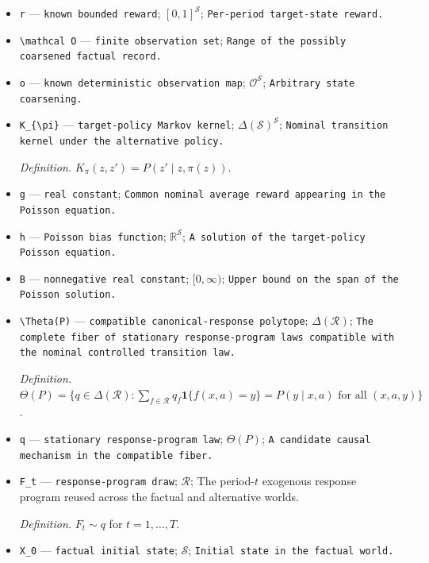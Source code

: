 \documentclass{article}
\begin{document}
\begin{itemize}
  \item \texttt{r} --- \texttt{known bounded reward}; \([0,1]^{\mathcal S}\); \texttt{Per-\allowbreak{}period target-\allowbreak{}state reward.}
  \item \texttt{\textbackslash{}\allowbreak{}mathcal O} --- \texttt{finite observation set}; \texttt{Range of the possibly coarsened factual record.}
  \item \texttt{o} --- \texttt{known deterministic observation map}; \(\mathcal O^{\mathcal S}\); \texttt{Arbitrary state coarsening.}
  \item \texttt{K\_\allowbreak{}\{\textbackslash{}\allowbreak{}pi\}\allowbreak{}} --- \texttt{target-\allowbreak{}policy Markov kernel}; \(\Delta(\mathcal S)^{\mathcal S}\); \texttt{Nominal transition kernel under the alternative policy.}
  \par\smallskip\noindent\emph{Definition.} \(K_{\pi}(z,z')=P(z'\mid z,\pi(z))\).
  \item \texttt{g} --- \texttt{real constant}; \texttt{Common nominal average reward appearing in the Poisson equation.}
  \item \texttt{h} --- \texttt{Poisson bias function}; \(\mathbb R^{\mathcal S}\); \texttt{A solution of the target-\allowbreak{}policy Poisson equation.}
  \item \texttt{B} --- \texttt{nonnegative real constant}; \([0,\infty)\); \texttt{Upper bound on the span of the Poisson solution.}
  \item \texttt{\textbackslash{}\allowbreak{}Theta(P)} --- \texttt{compatible canonical-\allowbreak{}response polytope}; \(\Delta(\mathcal R)\); \texttt{The complete fiber of stationary response-\allowbreak{}program laws compatible with the nominal controlled transition law.}
  \par\smallskip\noindent\emph{Definition.} \(\Theta(P)=\{q\in\Delta(\mathcal R):\sum_{f\in\mathcal R}q_f\mathbf 1\{f(x,a)=y\}=P(y\mid x,a)\text{ for all }(x,a,y)\}\).
  \item \texttt{q} --- \texttt{stationary response-\allowbreak{}program law}; \(\Theta(P)\); \texttt{A candidate causal mechanism in the compatible fiber.}
  \item \texttt{F\_\allowbreak{}t} --- \texttt{response-\allowbreak{}program draw}; \(\mathcal R\); The period-\(t\) exogenous response program reused across the factual and alternative worlds.
  \par\smallskip\noindent\emph{Definition.} \(F_t\sim q\) for \(t=1,\ldots,T\).
  \item \texttt{X\_\allowbreak{}0} --- \texttt{factual initial state}; \(\mathcal S\); \texttt{Initial state in the factual world.}

\end{itemize}
\end{document}
